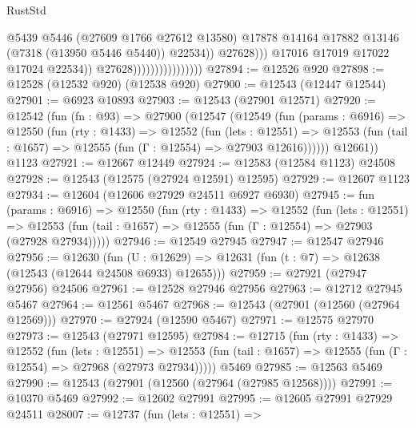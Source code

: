\begin{lexlean}{RustStd}
\begin{coremodule}
                                                  @5439
                                                  @5446
                                                  (@27609 @1766 @27612 @13580)
                                                  @17878
                                                  @14164
                                                  @17882
                                                  @13146
                                                  (@7318 (@13950 @5446 @5440))
                                                  @22534))
                                              @27628)))
                                        @17016
                                        @17019
                                        @17022
                                        @17024
                                        @22534))
                                    @27628))))))))))))))))
@27894 := @12526 @920
@27898 := @12528 (@12532 @920) (@12538 @920)
@27900 := @12543 (@12447 @12544)
@27901 := @6923 @10893
@27903 := @12543 (@27901 @12571)
@27920 := @12542
    (fun (fn : @93) =>
    @27900
      (@12547
        (@12549
          (fun (params : @6916) =>
          @12550
            (fun (rty : @1433) =>
            @12552
              (fun (lets : @12551) =>
              @12553 (fun (tail : @1657) => @12555 (fun (Γ : @12554) => @27903 @12616))))))
        @12661))
    @1123
@27921 := @12667 @12449
@27924 := @12583 (@12584 @1123) @24508
@27928 := @12543 (@12575 (@27924 @12591) @12595)
@27929 := @12607 @1123
@27934 := @12604 (@12606 @27929 @24511 @6927 @6930)
@27945 := fun (params : @6916) =>
  @12550
    (fun (rty : @1433) =>
    @12552
      (fun (lets : @12551) =>
      @12553 (fun (tail : @1657) => @12555 (fun (Γ : @12554) => @27903 (@27928 @27934)))))
@27946 := @12549 @27945
@27947 := @12547 @27946
@27956 := @12630
    (fun (U : @12629) => @12631 (fun (t : @7) => @12638 (@12543 (@12644 @24508 @6933) @12655)))
@27959 := @27921 (@27947 @27956) @24506
@27961 := @12528 @27946 @27956
@27963 := @12712 @27945 @5467
@27964 := @12561 @5467
@27968 := @12543 (@27901 (@12560 (@27964 @12569)))
@27970 := @27924 (@12590 @5467)
@27971 := @12575 @27970
@27973 := @12543 (@27971 @12595)
@27984 := @12715
    (fun (rty : @1433) =>
    @12552
      (fun (lets : @12551) =>
      @12553 (fun (tail : @1657) => @12555 (fun (Γ : @12554) => @27968 (@27973 @27934)))))
    @5469
@27985 := @12563 @5469
@27990 := @12543 (@27901 (@12560 (@27964 (@27985 @12568))))
@27991 := @10370 @5469
@27992 := @12602 @27991
@27995 := @12605 @27991 @27929 @24511
@28007 := @12737
    (fun (lets : @12551) =>

\end{coremodule}
\end{lexlean}
